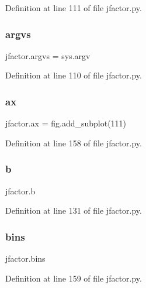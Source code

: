 Definition at line 111 of file jfactor.\+py.

\mbox{\label{namespacejfactor_a2f38906b89281fb8e6cdc4cbc9c8735e}} 
\subsubsection{\texorpdfstring{argvs}{argvs}}
{\footnotesize\ttfamily jfactor.\+argvs = sys.\+argv}



Definition at line 110 of file jfactor.\+py.

\mbox{\label{namespacejfactor_a768b65ab10ab4bc6a8783ad4fd176789}} 
\subsubsection{\texorpdfstring{ax}{ax}}
{\footnotesize\ttfamily jfactor.\+ax = fig.\+add\+\_\+subplot(111)}



Definition at line 158 of file jfactor.\+py.

\mbox{\label{namespacejfactor_a52f3e9e591dbe4f5d14f760a578cb15b}} 
\subsubsection{\texorpdfstring{b}{b}}
{\footnotesize\ttfamily jfactor.\+b}



Definition at line 131 of file jfactor.\+py.

\mbox{\label{namespacejfactor_a819ba1bdb19519796c682583f8b5971f}} 
\subsubsection{\texorpdfstring{bins}{bins}}
{\footnotesize\ttfamily jfactor.\+bins}



Definition at line 159 of file jfactor.\+py.

\mbox{\label{namespacejfactor_a69776fb72a257bd354abf1104511a3c7}} 
